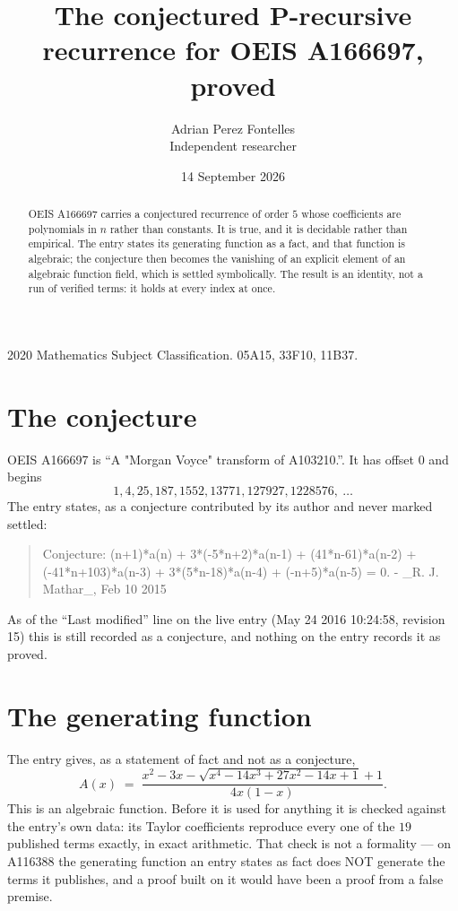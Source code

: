 \documentclass[11pt,a4paper]{article}
\title{The conjectured P-recursive recurrence for OEIS A166697, proved}
\author{Adrian Perez Fontelles\\ \small Independent researcher}
\date{14 September 2026}
\theoremstyle{plain}
\theoremstyle{definition}
\begin{document}
\maketitle

\begin{abstract}
OEIS A166697 carries a conjectured recurrence of order $5$ whose coefficients are polynomials in
$n$ rather than constants. It is true, and it is decidable rather than empirical. The entry
states its generating function as a fact, and that function is algebraic; the conjecture then
becomes the vanishing of an explicit element of an algebraic function field, which is settled
symbolically. The result is an identity, not a run of verified terms: it holds at every index
at once.
\end{abstract}

\noindent\small 2020 Mathematics Subject Classification. 05A15, 33F10, 11B37.\normalsize

\section{The conjecture}

OEIS A166697 is ``A "Morgan Voyce" transform of A103210.''. It has offset $0$ and begins
\[
1, 4, 25, 187, 1552, 13771, 127927, 1228576,\ \dots
\]
The entry states, as a conjecture contributed by its author and never marked settled:
\begin{quote}\raggedright\small
Conjecture: (n+1)*a(n) + 3*(-5*n+2)*a(n-1) + (41*n-61)*a(n-2) + (-41*n+103)*a(n-3) + 3*(5*n-18)*a(n-4) + (-n+5)*a(n-5) = 0. - \_R. J. Mathar\_, Feb 10 2015
\end{quote}
As of the ``Last modified'' line on the live entry (May 24 2016 10:24:58, revision 15)
this is still recorded as a conjecture, and nothing on the entry records it as proved.

\section{The generating function}

The entry gives, as a statement of fact and not as a conjecture,
\[
A(x)\;=\;\frac{x^{2} - 3 x - \sqrt{x^{4} - 14 x^{3} + 27 x^{2} - 14 x + 1} + 1}{4 x \left(1 - x\right)} .
\]
This is an algebraic function. Before it is used for anything it is checked against the entry's
own data: its Taylor coefficients reproduce every one of the $19$ published terms
exactly, in exact arithmetic. That check is not a formality --- on A116388 the generating
function an entry states as fact does NOT generate the terms it publishes, and a proof built on
it would have been a proof from a false premise.
\end{document}
